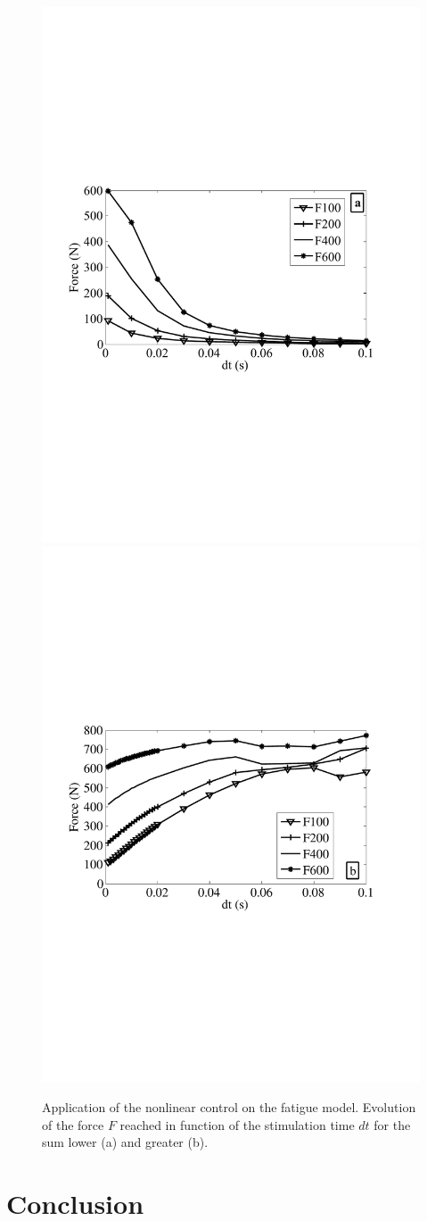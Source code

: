 \documentclass[10pt,twocolumn,letterpaper, 
]{article}
\begin{document}
 \begin{figure}[t!]
	\centering
	\vspace{-2cm}
		\includegraphics[width=0.48\columnwidth]{fsdessousfat.pdf}
		\includegraphics[width=0.48\columnwidth]{ffatoki.pdf}
		\vspace{-1.8cm}
\caption{Application of the nonlinear control on the fatigue model. Evolution of the force $F$ reached in function of the stimulation time $dt$ for the sum lower (a) and greater (b).}
\vspace{-0.5cm}
	\end{figure}
	
\section{Conclusion}
\end{document}
